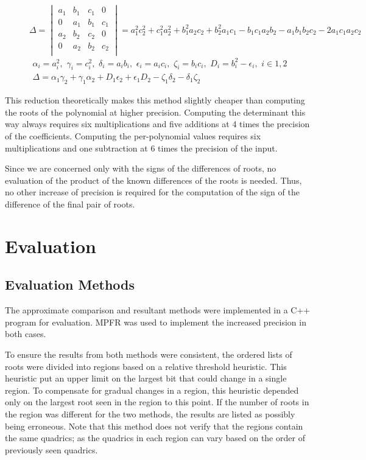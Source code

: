 \documentclass{cccg16}
\begin{document}
\begin{figure}
  \begin{equation*}
    \Delta=\begin{vmatrix}
    a_1 & b_1 & c_1 & 0\\
    0 & a_1 & b_1 & c_1\\
    a_2 & b_2 & c_2 & 0\\
    0 & a_2 & b_2 & c_2\\
    \end{vmatrix}=
    a_1^2 c_2^2 + c_1^2 a_2^2 + b_1^2 a_2 c_2 + b_2^2 a_1 c_1 -
    b_1 c_1 a_2 b_2 - a_1 b_1 b_2 c_2 - 2 a_1 c_1 a_2 c_2
  \end{equation*}
  \begin{align}
    \alpha_i=a_i^2,\,\, \gamma_i=c_i^2,\,\,
    \delta_i=a_i b_i,\,\, \epsilon_i=a_i c_i,\,\, \zeta_i=b_i c_i,\,\,
    D_i=b_i^2-\epsilon_i,\,\,
    i\in {1, 2}\\
    \Delta = \alpha_1 \gamma_2 + \gamma_1 \alpha_2 +
    D_1 \epsilon_2 + \epsilon_1 D_2 - \zeta_1 \delta_2 -
    \delta_1 \zeta_2
  \label{eq:sylvpoly}
  \end{align}
\end{figure}

This reduction theoretically makes this method slightly cheaper than
computing the roots of the polynomial at higher precision.  Computing
the determinant this way always requires six multiplications and five
additions at 4 times the precision of the coefficients.  Computing the
per-polynomial values requires six multiplications and one subtraction
at 6 times the precision of the input.

Since we are concerned only with the signs of the differences of
roots, no evaluation of the product of the known differences of the
roots is needed.  Thus, no other increase of precision is required for
the computation of the sign of the difference of the final pair of
roots.

\section{Evaluation}
\subsection{Evaluation Methods}
The approximate comparison and resultant methods were implemented in a
C++ program for evaluation.  MPFR was used to implement the increased
precision in both cases.

To ensure the results from both methods were consistent, the ordered
lists of roots were divided into regions based on a relative threshold
heuristic.  This heuristic put an upper limit on the largest bit that
could change in a single region.  To compensate for gradual changes in
a region, this heuristic depended only on the largest root seen in the
region to this point.  If the number of roots in the region was
different for the two methods, the results are listed as possibly
being erroneous.  Note that this method does not verify that the
regions contain the same quadrics; as the quadrics in each region can
vary based on the order of previously seen quadrics.
\end{document}

